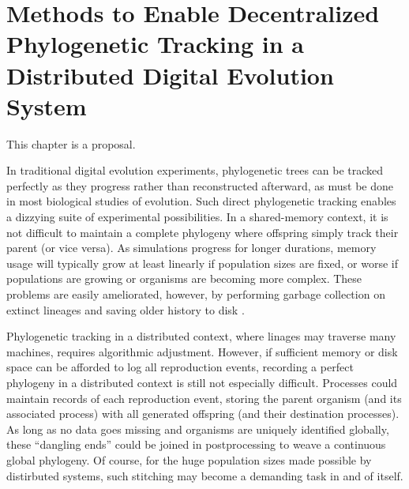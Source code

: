 \chapter{Methods to Enable Decentralized Phylogenetic Tracking in a Distributed Digital Evolution System}
\label{ch:distributed-phylogeny}

\noindent
This chapter is a proposal.

In traditional digital evolution experiments, phylogenetic trees can be tracked perfectly as they progress \citep{bohm2017mabe,wang2018vine,lalejini2019data} rather than reconstructed afterward, as must be done in most biological studies of evolution.
Such direct phylogenetic tracking enables a dizzying suite of experimental possibilities.
In a shared-memory context, it is not difficult to maintain a complete phylogeny where offspring simply track their parent (or vice versa).
As simulations progress for longer durations, memory usage will typically grow at least linearly if population sizes are fixed, or worse if populations are growing or organisms are becoming more complex.
These problems are easily ameliorated, however, by performing garbage collection on extinct lineages and saving older history to disk \citep{bohm2017mabe,dolson2019modes}.

Phylogenetic tracking in a distributed context, where linages may traverse many machines, requires algorithmic adjustment.
However, if sufficient memory or disk space can be afforded to log all reproduction events, recording a perfect phylogeny in a distributed context is still not especially difficult.
Processes could maintain records of each reproduction event, storing the parent organism (and its associated process) with all generated offspring (and their destination processes).
As long as no data goes missing and organisms are uniquely identified globally, these ``dangling ends'' could be joined in postprocessing to weave a continuous global phylogeny.
Of course, for the huge population sizes made possible by distirbuted systems, such stitching may become a demanding task in and of itself.

